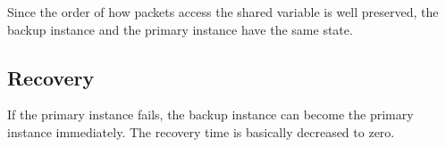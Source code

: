 Since the order of how packets access the shared variable is well preserved,
the backup instance and the primary instance have the same state.

\subsection{Recovery}

If the primary instance fails, the backup instance can become the primary
instance immediately. The recovery time is basically decreased to zero.





